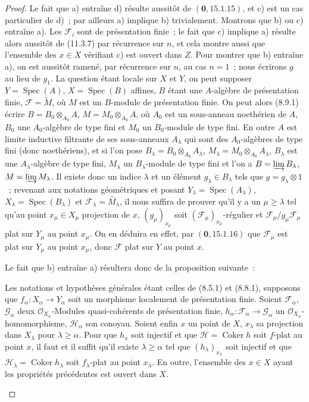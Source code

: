 \begin{proof}
Le fait que a) entraîne d) résulte aussitôt de $(\mathbf 0,15.1.15)$, et c) est
un cas particulier de d)~; par ailleurs a) implique b) trivialement. Montrons
que b) ou c) entraîne a). Les $\mathcal F_i$ sont de présentation finie~; le
fait que c) implique a) résulte alors aussitôt de (11.3.7) par récurrence sur
$n$, et cela montre aussi que l'ensemble des $x\in X$ vérifiant c) est ouvert
dans $Z$. Pour montrer que b) entraîne a), on est aussitôt ramené, par
récurrence sur $n$, au cas $n=1$~; nous écrirons $g$ au lieu de $g_1$. La
question étant locale sur $X$ et $Y$, on peut supposer
$Y=\operatorname{Spec}(A)$, $X=\operatorname{Spec}(B)$ affines, $B$ étant une
$A$-algèbre de présentation finie, $\mathcal F=\widetilde M$, où $M$ est un
$B$-module de présentation finie. On peut alors (8.9.1) écrire
$B=B_0\otimes_{A_0}A$, $M=M_0\otimes_{A_0}A$, où $A_0$ est un sous-anneau
noethérien de $A$, $B_0$ une $A_0$-algèbre de type fini et $M_0$ un
$B_0$-module de type fini. En outre $A$ est limite inductive filtrante de ses
sous-anneaux $A_\lambda$ qui sont des $A_0$-algèbres de type fini (donc
noethériens), et si l'on pose
$B_\lambda=B_0\otimes_{A_0}A_\lambda$,
$M_\lambda=M_0\otimes_{A_0}A_\lambda$, $B_\lambda$ est une
$A_\lambda$-algèbre de type fini, $M_\lambda$ un $B_\lambda$-module de type
fini et l'on a $B=\varinjlim B_\lambda$, $M=\varinjlim M_\lambda$. Il existe
donc un indice $\lambda$ et un élément $g_\lambda\in B_\lambda$ tels que
$g=g_\lambda\otimes1$~; revenant aux notations géométriques et posant
$Y_\lambda=\operatorname{Spec}(A_\lambda)$,
$X_\lambda=\operatorname{Spec}(B_\lambda)$ et
$\mathcal F_\lambda=\widetilde{M_\lambda}$, il nous suffira de prouver qu'il y
a un $\mu\geq\lambda$ tel qu'au point $x_\mu\in X_\mu$ projection de $x$,
$(g_\mu)_{x_\mu}$ soit $(\mathcal F_\mu)_{x_\mu}$-régulier et
$\mathcal F_\mu/g_\mu\mathcal F_\mu$ plat sur $Y_\mu$ au point $x_\mu$. On en
déduira en effet, par $(\mathbf 0,15.1.16)$ que $\mathcal F_\mu$ est plat sur
$Y_\mu$ au point $x_\mu$, donc $\mathcal F$ plat sur $Y$ au point $x$.

Le fait que b) entraîne a) résultera donc de la proposition suivante~:

\begin{proposition}[11.3.9]
\label{IV.11.3.9-fr}
Les notations et hypothèses générales étant celles de (8.5.1) et (8.8.1),
supposons que $f_\alpha:X_\alpha\to Y_\alpha$ soit un morphisme localement de
présentation finie. Soient $\mathcal F_\alpha$, $\mathcal G_\alpha$ deux
$\mathcal O_{X_\alpha}$-Modules quasi-cohérents de présentation finie,
$h_\alpha:\mathcal F_\alpha\to\mathcal G_\alpha$ un
$\mathcal O_{X_\alpha}$-homomorphisme, $\mathcal H_\alpha$ son conoyau. Soient
enfin $x$ un point de $X$, $x_\lambda$ sa projection dans $X_\lambda$ pour
$\lambda\geq\alpha$. Pour que $h_x$ soit injectif et que
$\mathcal H=\operatorname{Coker}h$ soit $f$-plat au point $x$, il faut et il
suffit qu'il existe $\lambda\geq\alpha$ tel que $(h_\lambda)_{x_\lambda}$ soit
injectif et que $\mathcal H_\lambda=\operatorname{Coker}h_\lambda$ soit
$f_\lambda$-plat au point $x_\lambda$. En outre, l'ensemble des $x\in X$ ayant
les propriétés précédentes est ouvert dans $X$.
\end{proposition}


\end{proof}
